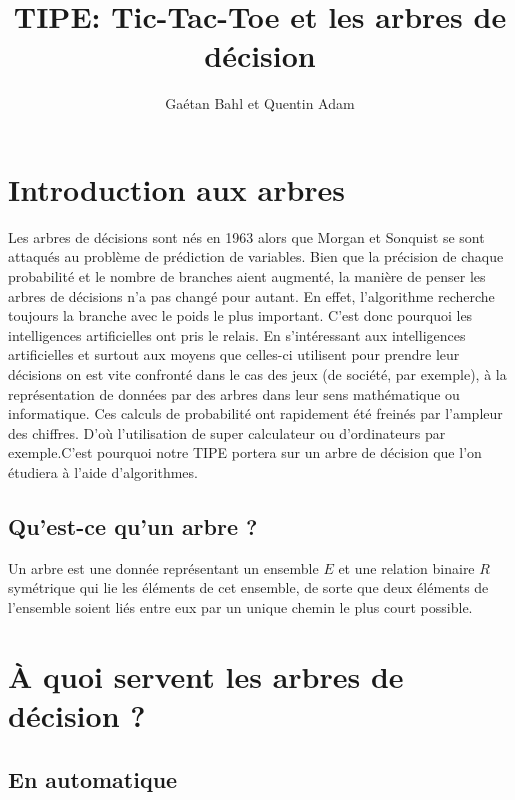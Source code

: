 \documentclass{article}
\title{TIPE: Tic-Tac-Toe et les arbres de décision}
\author{Gaétan Bahl et Quentin Adam}
\begin{document}
\maketitle
\tableofcontents


\clearpage

\section{Introduction aux arbres}

Les arbres de décisions sont nés en 1963 alors que Morgan et Sonquist se sont attaqués au problème de prédiction de variables. Bien que la précision de chaque probabilité et le nombre de branches aient augmenté, la manière de penser les arbres de décisions n'a pas changé pour autant. En effet, l'algorithme recherche toujours la branche avec le poids le plus important. C'est donc pourquoi les intelligences artificielles ont pris le relais.
En s'intéressant aux intelligences artificielles et surtout aux moyens que
celles-ci utilisent pour prendre leur décisions
on est vite confronté dans le cas des jeux (de société, par exemple), à la
représentation de données par des arbres dans leur sens mathématique ou
informatique. Ces calculs de probabilité ont rapidement été freinés par l'ampleur des chiffres. D'où l'utilisation de super calculateur ou d'ordinateurs par exemple.C'est pourquoi notre TIPE portera sur un arbre de décision que l'on étudiera à l'aide d'algorithmes.


\subsection{Qu'est-ce qu'un arbre ?}

Un arbre est une donnée représentant un ensemble $E$ et une relation binaire $R$
symétrique qui lie les éléments de cet ensemble,
de sorte que deux éléments de l'ensemble soient liés entre eux par un unique
chemin le plus court possible.






\section{\uppercase{à} quoi servent les arbres de décision ?}

\subsection{En automatique}
\end{document}

